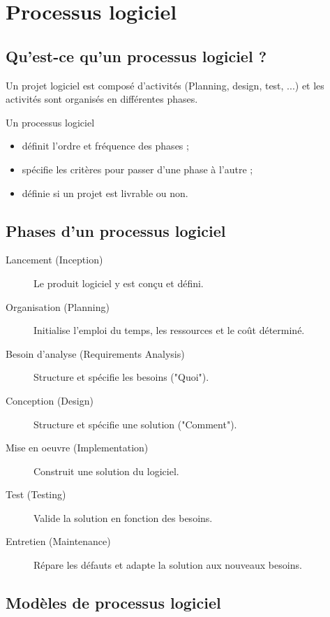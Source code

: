 \section{Processus logiciel}



\subsection{Qu'est-ce qu'un processus logiciel ?}
Un projet logiciel est composé d'activités (Planning, design, test, ...) et les activités sont organisés en différentes phases.

Un processus logiciel
\begin{itemize}
    \item définit l'ordre et fréquence des phases ;
    \item spécifie les critères pour passer d'une phase à l'autre ;
    \item définie si un projet est livrable ou non.
\end{itemize}



\subsection{Phases d'un processus logiciel}
\begin{description}
    \item [Lancement (Inception)] Le produit logiciel y est conçu et défini.
    \item [Organisation (Planning)] Initialise l'emploi du temps, les ressources et le coût déterminé.
    \item [Besoin d'analyse (Requirements Analysis)] Structure et spécifie les besoins ("Quoi").
    \item [Conception (Design)] Structure et spécifie une solution ("Comment").
    \item [Mise en oeuvre (Implementation)] Construit une solution du logiciel.
    \item [Test (Testing)] Valide la solution en fonction des besoins.
    \item [Entretien (Maintenance)] Répare les défauts et adapte la solution aux nouveaux besoins.
\end{description}



\subsection{Modèles de processus logiciel}



